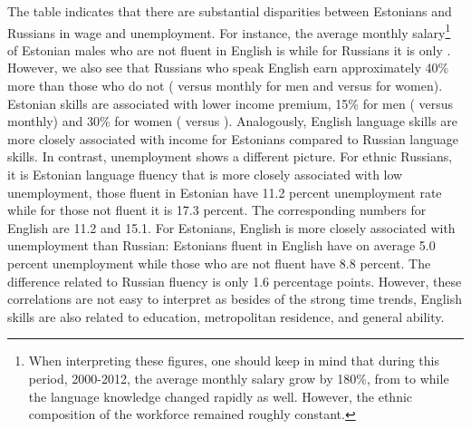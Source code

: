 \documentclass[12pt, a4paper]{article}
\begin{document}
The table indicates that there are substantial disparities between
Estonians and Russians in wage and unemployment. For instance, the
average monthly salary\footnote{When interpreting these figures,
 one should keep in mind that during this period, 2000-2012, the average monthly salary grow by 180\%,
 from  to  while the language knowledge changed rapidly as
well. However, the ethnic composition of the workforce remained roughly constant.} of Estonian
males who are not fluent in English is  while for Russians it
is only . However, we also see that Russians who speak
English earn approximately 40\% more than those who do not (
versus  monthly for men and  versus  for
women). Estonian skills are associated with lower income premium, 15\%
for men ( versus  monthly) and 30\% for women
( versus ). Analogously, English language skills are more closely
associated with income for Estonians compared to Russian language skills. In
contrast, unemployment shows a different picture. For ethnic Russians,
it is Estonian language fluency that is more closely associated with
low unemployment, those fluent in Estonian have 11.2 percent
unemployment rate while for those not fluent it is 17.3 percent. The
corresponding numbers for English are 11.2 and 15.1. For Estonians,
English is more closely associated with unemployment than Russian:
Estonians fluent in English have on average 5.0 percent unemployment
while those who are not fluent have 8.8 percent. The difference
related to Russian fluency is only 1.6 percentage points. However,
these correlations are not easy to interpret as besides of the strong
time trends, English skills are
also related to education, metropolitan residence, and general
ability.
\end{document}

